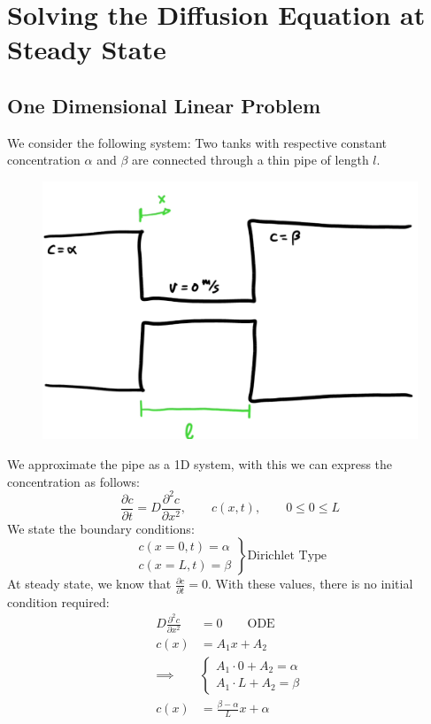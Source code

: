 \section{Solving the Diffusion Equation at Steady State}
\subsection{One Dimensional Linear Problem}
We consider the following system: Two tanks with respective constant concentration $\alpha$ and $\beta$ are connected through a thin pipe of length $l$.
\begin{figure}[H]
	\centering
	\includegraphics[width=0.5\linewidth]{Sketches/TanksDiffusion}
	\label{fig:tanksdiffusion}
\end{figure}

We approximate the pipe as a 1D system, with this we can express the concentration as follows:
\begin{equation*}
	\frac{\partial c}{\partial t} = D\frac{\partial ^2 c}{\partial x^2},\qquad c(x,t),\qquad 0\le 0 \le L
\end{equation*}
We state the boundary conditions:
\begin{equation*}
	\left.\begin{split}
		c(x=0,t)= \alpha\\
		c(x=L,t)= \beta
	\end{split}\right\} \text{Dirichlet Type}
\end{equation*}
At steady state, we know that $\frac{\partial c}{\partial t} = 0$. With these values, there is no initial condition required:
\begin{equation*}
	\begin{split}
		D\frac{\partial ^2 c}{\partial x^2} &= 0\qquad \text{ODE}\\
		c(x) &= A_1x+A_2\\
		\implies &\begin{cases}
			A_1\cdot 0 + A_2 = \alpha\\
			A_1\cdot L + A_2 = \beta
		\end{cases}\\
		c(x) &= \frac{\beta- \alpha}{L}x + \alpha
	\end{split}
\end{equation*}


